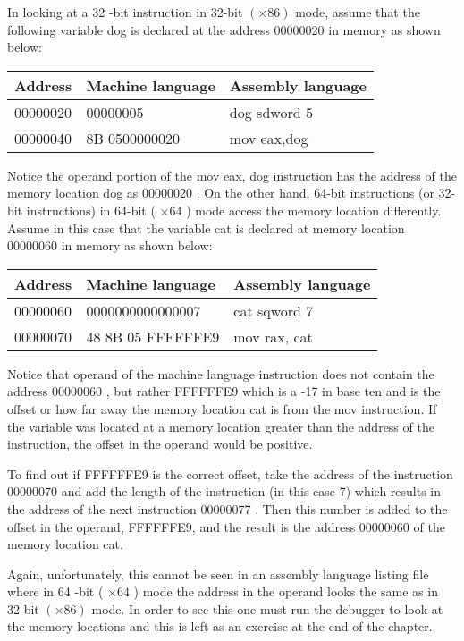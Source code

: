 \documentclass[10pt]{article}
\begin{document}
In looking at a 32 -bit instruction in 32-bit $(\times 86)$ mode, assume that the following variable dog is declared at the address 00000020 in memory as shown below:

\begin{center}
\begin{tabular}{|l|l|l|}
\hline
Address & Machine language & Assembly language \\
\hline
00000020 & 00000005 & dog sdword 5 \\
\hline
00000040 & 8B 0500000020 & mov eax,dog \\
\hline
\end{tabular}
\end{center}

Notice the operand portion of the mov eax, dog instruction has the address of the memory location dog as 00000020 . On the other hand, 64-bit instructions (or 32-bit instructions) in 64-bit ( $\times 64$ ) mode access the memory location differently. Assume in this case that the variable cat is declared at memory location 00000060 in memory as shown below:

\begin{center}
\begin{tabular}{|l|l|l|}
\hline
Address & Machine language & Assembly language \\
\hline
00000060 & 0000000000000007 & cat sqword 7 \\
\hline
00000070 & 48 8B 05 FFFFFFE9 & mov rax, cat \\
\hline
\end{tabular}
\end{center}

Notice that operand of the machine language instruction does not contain the address 00000060 , but rather FFFFFFE9 which is a -17 in base ten and is the offset or how far away the memory location cat is from the mov instruction. If the variable was located at a memory location greater than the address of the instruction, the offset in the operand would be positive.

To find out if FFFFFFE9 is the correct offset, take the address of the instruction 00000070 and add the length of the instruction (in this case 7) which results in the address of the next instruction 00000077 . Then this number is added to the offset in the operand, FFFFFFE9, and the result is the address 00000060 of the memory location cat.

Again, unfortunately, this cannot be seen in an assembly language listing file where in 64 -bit ( $\times 64$ ) mode the address in the operand looks the same as in 32-bit $(\times 86)$ mode. In order to see this one must run the debugger to look at the memory locations and this is left as an exercise at the end of the chapter.
\end{document}
